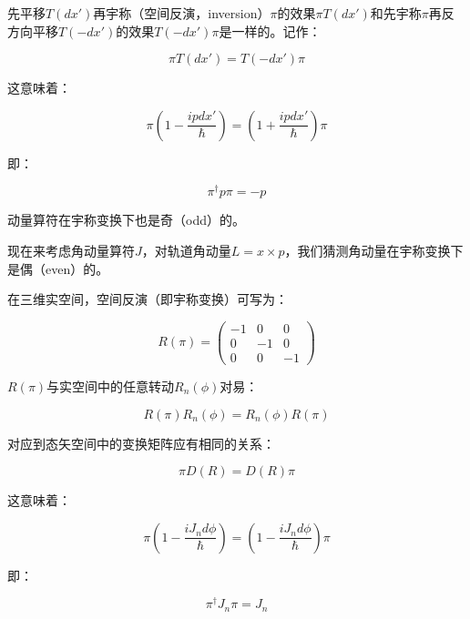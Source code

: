 先平移$T(dx')$再宇称（空间反演，inversion）$\pi$的效果$\pi T(dx')$和先宇称$\pi$再反方向平移$T(- dx')$的效果$ T(- dx') \pi$是一样的。记作：

\begin{equation}
\pi T(dx') = T(- dx') \pi
\end{equation}

这意味着：

\begin{equation}
\pi \left( 1 - \frac{i p dx'}{\hbar}   \right) = \left( 1 + \frac{i p dx'}{\hbar}   \right) \pi
\end{equation}

即：

\begin{equation}
\pi^\dagger p \pi = - p
\end{equation}

动量算符在宇称变换下也是奇（odd）的。

现在来考虑角动量算符$J$，对轨道角动量$L = x \times p$，我们猜测角动量在宇称变换下是偶（even）的。

在三维实空间，空间反演（即宇称变换）可写为：

\begin{equation}
R(\pi) = \left( \begin{array}{ccc} -1 & 0 & 0 \\ 0 & -1 & 0 \\ 0 & 0 & -1  \end{array}  \right)
\end{equation}

$R(\pi)$与实空间中的任意转动$R_{n} (\phi)$对易：

\begin{equation}
R(\pi) R_{n} (\phi) = R_{n} (\phi) R(\pi)
\end{equation}

对应到态矢空间中的变换矩阵应有相同的关系：

\begin{equation}
\pi D(R) = D(R) \pi
\end{equation}

这意味着：

\begin{equation}
\pi \left( 1- \frac{i J_n d \phi}{\hbar}  \right) = \left( 1- \frac{i J_n d \phi}{\hbar}  \right) \pi
\end{equation}

即：

\begin{equation}
\pi^\dagger J_n \pi = J_n 
\end{equation}

